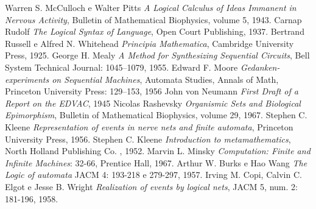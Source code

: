 \documentclass[10pt]{article}
\begin{document}
\newpage

\begin{thebibliography}{3}
	 Warren S. McCulloch e Walter Pitts \textit{A Logical Calculus of Ideas Immanent in Nervous Activity}, Bulletin of Mathematical Biophysics, volume 5, 1943.
	 Carnap Rudolf \textit{The Logical Syntax of Language}, Open Court Publishing, 1937.
	 Bertrand Russell e Alfred N. Whitehead \textit{Principia Mathematica}, Cambridge University Press, 1925.
	 George H. Mealy \textit{A Method for Synthesizing Sequential Circuits}, Bell System Technical Journal: 1045–1079, 1955.
	 Edward F. Moore \textit{Gedanken-experiments on Sequential Machines}, Automata Studies, Annals of Math, Princeton University Press: 129–153, 1956
	 John von Neumann \textit{First Draft of a Report on the EDVAC}, 1945
	 Nicolas Rashevsky \textit{Organismic Sets and Biological Epimorphism}, Bulletin of Mathematical Biophysics, volume 29, 1967.
	 Stephen C. Kleene \textit{Representation of events in nerve nets and finite automata}, Princeton University Press, 1956.
	 Stephen C. Kleene \textit{Introduction to metamathematics}, North Holland Publishing Co. , 1952.
	 Marvin L. Minsky \textit{Computation: Finite and Infinite Machines}: 32-66, Prentice Hall, 1967.
	 Arthur W. Burks e Hao Wang \textit{The Logic of automata} JACM 4: 193-218 e 279-297, 1957.
	 Irving M. Copi, Calvin C. Elgot e Jesse B. Wright \textit{Realization of events by logical nets}, JACM 5, num. 2: 181-196, 1958.
	\end{thebibliography}
\end{document}
